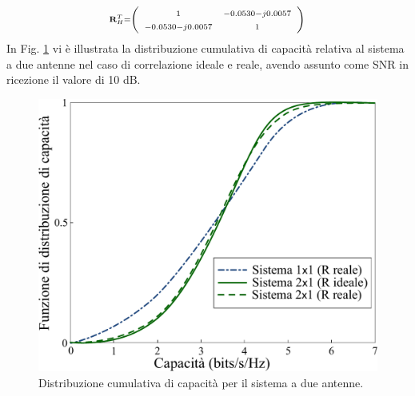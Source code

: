 \documentclass[technote]{IEEEtran}
\begin{document}
\[ \scriptstyle {\bf{R}}_H^T = \left( {\begin{array}{*{20}{c}}
\scriptstyle 1&\scriptstyle{ - 0.0530 - j0.0057}\\
\scriptstyle{ - 0.0530 - j0.0057}& \scriptstyle 1
\end{array}} \right)\]
In Fig. \ref{fig:34} vi è illustrata la distribuzione cumulativa di capacità relativa al sistema a due antenne nel caso di correlazione ideale e reale, avendo assunto come SNR in ricezione il valore di 10 dB.

\begin{figure}[!ht]
\centering
\includegraphics[width=.8\columnwidth]{figure34}
\caption{Distribuzione cumulativa di capacità per il sistema a due antenne.}
\label{fig:34}
\end{figure}
\end{document}
